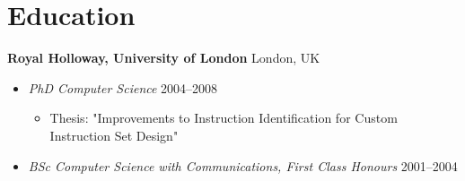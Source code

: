 \section*{Education}

\textbf{Royal Holloway, University of London} \hfill London, UK

\begin{itemize}
\item \textit{PhD Computer Science} \hfill 2004--2008
\begin{itemize}
\item Thesis: "Improvements to Instruction Identification for Custom Instruction Set Design"
\end{itemize}
\item \textit{BSc Computer Science with Communications, First Class Honours} \hfill 2001--2004

\end{itemize}
